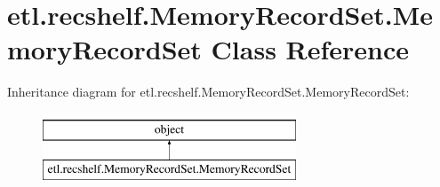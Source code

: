 \hypertarget{classetl_1_1recshelf_1_1MemoryRecordSet_1_1MemoryRecordSet}{\section{etl.\-recshelf.\-Memory\-Record\-Set.\-Memory\-Record\-Set Class Reference}
\label{classetl_1_1recshelf_1_1MemoryRecordSet_1_1MemoryRecordSet}
}
Inheritance diagram for etl.\-recshelf.\-Memory\-Record\-Set.\-Memory\-Record\-Set\-:\begin{figure}[H]
\begin{center}
\leavevmode
\includegraphics[height=2.000000cm]{classetl_1_1recshelf_1_1MemoryRecordSet_1_1MemoryRecordSet}
\end{center}
\end{figure}
